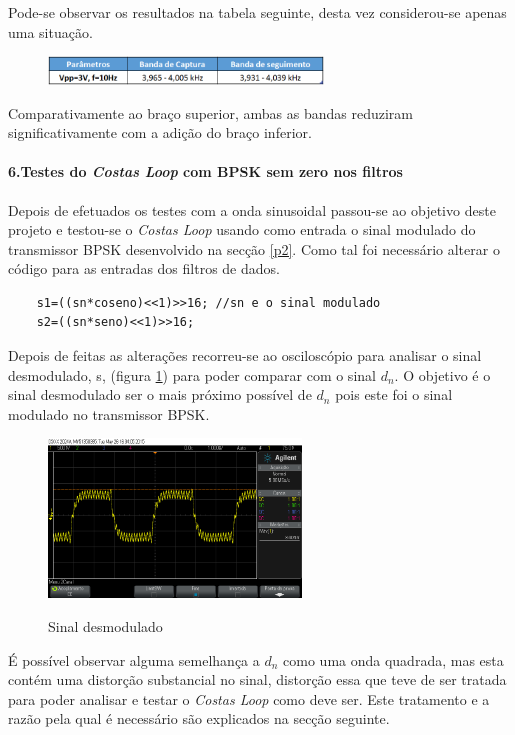 \documentclass[11pt]{article}
\numberwithin{equation}{section}
\begin{document}
Pode-se observar os resultados na tabela seguinte, desta vez considerou-se apenas uma situação. 
\begin{figure}[H]
	\centering
	\includegraphics[width=0.65\textwidth]{./tab_costa}~\\
\end{figure}

Comparativamente ao braço superior, ambas as bandas reduziram significativamente com a adição do braço inferior.

\paragraph{6.Testes do \textit{Costas Loop} com BPSK sem zero nos filtros} \hspace{0pt} \label{para:P3-6}

Depois de efetuados os testes com a onda sinusoidal passou-se ao objetivo deste projeto e testou-se o \textit{Costas Loop} usando como entrada o sinal modulado do transmissor BPSK desenvolvido na secção \ref{p2}. Como tal foi necessário alterar o código para as entradas dos filtros de dados.
\begin{lstlisting}
	s1=((sn*coseno)<<1)>>16; //sn e o sinal modulado
	s2=((sn*seno)<<1)>>16;
\end{lstlisting}
Depois de feitas as alterações recorreu-se ao osciloscópio para analisar o sinal desmodulado, s, (figura \ref{demod_sz}) para poder comparar com o sinal $d_n$. O objetivo é o sinal desmodulado ser o mais próximo possível de $d_n$ pois este foi o sinal modulado no transmissor BPSK.
\begin{figure}[H]
 	\centering
 	\includegraphics[width=0.6\textwidth]{./demod_semzero}~\\
 	\caption{Sinal desmodulado}
 	\label{demod_sz}
\end{figure}
É possível observar alguma semelhança a $d_n$ como uma onda quadrada, mas esta contém uma distorção substancial no sinal, distorção essa que teve de ser tratada para poder analisar e testar o \textit{Costas Loop} como deve ser. Este tratamento e a razão pela qual é necessário são explicados na secção seguinte.
\end{document}
